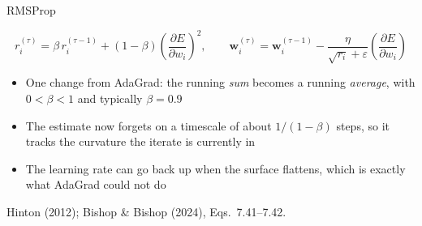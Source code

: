 \documentclass[aspectratio=169, 11pt]{beamer}
\newcommand{\srcline}[1]{%
  \par\vspace{0.25em}%
  {\scriptsize\color{mcMuted}\hfill #1\par}}
\newcommand{\src}[3]{}      %
\begin{document}
\begin{frame}{RMSProp}
  \src{bishop2024}{equation}{7.41-7.42}
  \src{bishop2024}{section}{7.3.3}
  \src{hinton2012}{page}{29}
  \vspace{-0.3em}
  \[
    r^{(\tau)}_i = \beta\, r^{(\tau-1)}_i
      + (1-\beta)\left(\frac{\partial E}{\partial w_i}\right)^{2} ,
    \qquad
    \mathbf{w}^{(\tau)}_i = \mathbf{w}^{(\tau-1)}_i
      - \frac{\eta}{\sqrt{r_i} + \varepsilon}
        \left(\frac{\partial E}{\partial w_i}\right)
  \]
  \vspace{-0.5em}
  \begin{itemize}\itemsep0.4em
    \item One change from AdaGrad: the running \emph{sum} becomes a
          running \emph{average}, with $0 < \beta < 1$ and typically
          $\beta = 0.9$
    \item The estimate now forgets on a timescale of about
          $1/(1-\beta)$ steps, so it tracks the curvature the iterate is
          currently in
    \item The learning rate can go back up when the surface flattens,
          which is exactly what AdaGrad could not do
  \end{itemize}
  \srcline{Hinton (2012); Bishop \& Bishop (2024), Eqs.~7.41--7.42.}
\end{frame}
\end{document}
